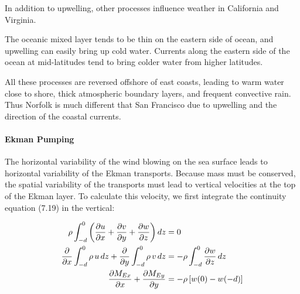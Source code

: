 In addition to upwelling, other processes influence weather in
California and Virginia.
\begin{enumerate}
\vitem
The oceanic mixed layer tends to be thin on the eastern
side of ocean, and upwelling can easily bring up cold water.
\vitem
Currents along the eastern side of the ocean at mid-latitudes tend to bring
colder water from higher latitudes.
\end{enumerate}
All these processes are reversed offshore of east coasts, leading to warm
water close to shore, thick atmospheric boundary layers, and frequent convective
rain. Thus Norfolk is much different that San Francisco due to
upwelling and the direction of the coastal currents.

\paragraph{Ekman Pumping}
The horizontal variability of the wind blowing on the sea surface leads to horizontal variability of the Ekman transports. Because mass must be conserved, the spatial variability of the transports must lead to vertical velocities at the top of the Ekman layer. To calculate this velocity, we first integrate the continuity equation (7.19) in the vertical:

\begin{equation}
\begin{aligned}
\rho\int_{-d}^0 \left( \frac{\partial{u}}{\partial{x}}+\frac{\partial{v}}{\partial{y}}+\frac{\partial{w}}{\partial{z}} \right) dz &=0
\notag
\\
\frac{\partial}{\partial{x}}\int_{-d}^0 \rho\,u\,dz +\frac{\partial}{\partial{y}}\int_{-d}^0\rho\,v\,dz
&=- \rho \int_{-d}^0 \frac{\partial{w}}{\partial{z}}\, dz
\notag \\
\frac{\partial{M_{Ex}}}{\partial{x}}+\frac{\partial{M_{Ey}}}{\partial{y}} &=-\rho \left[ w(0)-w(-d)\right]
\end{aligned}
\end{equation}

